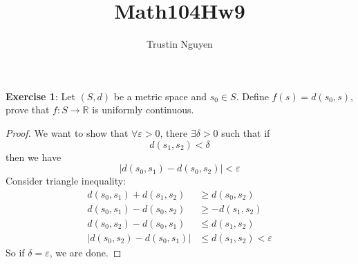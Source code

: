 \documentclass{article}
\title{Math104Hw9}
\author{Trustin Nguyen}
\begin{document}
    \maketitle

\reversemarginpar

\textbf{Exercise 1}: Let $(S, d)$ be a metric space and $s_{0} \in S$. Define $f(s) = d(s_{0}, s)$, prove that $f : S \rightarrow \mathbb{R}$ is uniformly continuous.
    \begin{proof}
        We want to show that $\forall \varepsilon> 0$, there $\exists \delta > 0$ such that if
            \begin{equation*}
                d(s_{1}, s_{2}) < \delta
            \end{equation*}
        then we have
            \begin{equation*}
                \lvert d(s_{0}, s_{1}) - d(s_{0}, s_{2}) \rvert < \varepsilon
            \end{equation*}
        Consider triangle inequality:   
            \begin{align*}
                    d(s_{0}, s_{1}) + d(s_{1}, s_{2})           &\geq   d(s_{0}, s_{2})                \\
                d(s_{0}, s_{1}) - d(s_{0}, s_{2})               &\geq  -d(s_{1}, s_{2})                \\
                d(s_{0}, s_{2}) - d(s_{0}, s_{1})               &\leq   d(s_{1}, s_{2})                \\
                \lvert d(s_{0}, s_{2}) - d(s_{0}, s_{1}) \rvert & \leq   d(s_{1}, s_{2}) < \varepsilon   
            \end{align*}
        So if $\delta = \varepsilon$, we are done.
    \end{proof}
\end{document}
